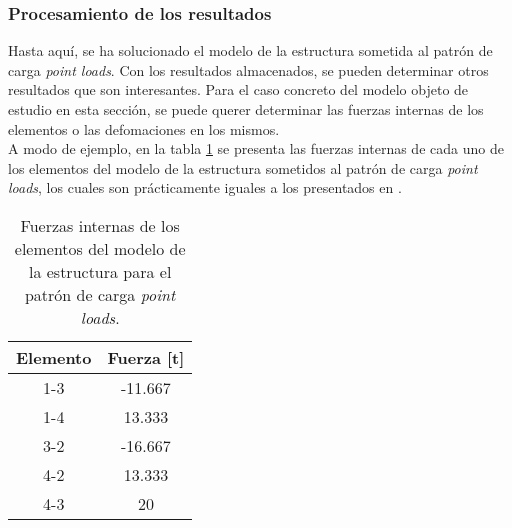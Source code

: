 \subsubsection{Procesamiento de los resultados}

Hasta aquí, se ha solucionado el modelo de la estructura sometida al patrón de carga \textit{point loads}. Con los resultados almacenados, se pueden determinar otros resultados que son interesantes. Para el caso concreto del modelo objeto de estudio en esta sección, se puede querer determinar las fuerzas internas de los elementos o las defomaciones en los mismos. \\

A modo de ejemplo, en la tabla \ref{tab:internal_forces} se presenta las fuerzas internas de cada uno de los elementos del modelo de la estructura sometidos al patrón de carga \textit{point loads}, los cuales son prácticamente iguales a los presentados en \cite{escamilla1995microcomputadores}.
\begin{table}[h]
    \centering
    \begin{tabular}{|c|c|}
        \hline
        Elemento & Fuerza [\si{\tonne}] \\
        \hline
        1-3 & -11.667 \\
        \hline
        1-4 & 13.333 \\
        \hline
        3-2 & -16.667 \\
        \hline
        4-2 & 13.333 \\
        \hline
        4-3 & 20 \\
        \hline
    \end{tabular}
    \caption{Fuerzas internas de los elementos del modelo de la estructura para el patrón de carga \textit{point loads}.}
    \label{tab:internal_forces}
\end{table}


